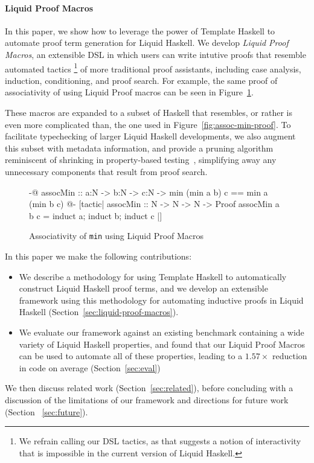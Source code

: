 \paragraph*{Liquid Proof Macros}

In this paper, we show how to leverage the power of Template Haskell
to automate proof term generation for Liquid Haskell.  We develop {\em
  Liquid Proof Macros}, an extensible DSL in which users can write
intutive proofs that resemble automated tactics%
\footnote{We refrain calling our DSL tactics, as that suggests a
  notion of interactivity that is impossible in the current version
  of Liquid Haskell.}%
%
 of more traditional proof assistants, including case analysis,
 induction, conditioning, and proof search. For example, the same
 proof of associativity of  using Liquid Proof macros can be
 seen in Figure~\ref{fig:assoc-min-macro}.

These macros are expanded to a subset of Haskell that resembles, or
rather is even more complicated than, the one used in
Figure~\ref{fig:assoc-min-proof}. To facilitate typechecking of larger
Liquid Haskell developments, we also augment this subset with metadata
information, and provide a pruning algorithm reminiscent of shrinking
in property-based testing~\cite{ClaessenH00}, simplifying away any
unnecessary components that result from proof search.


\begin{figure}[t]
\begin{code}
  {-@ assocMin :: a:N -> b:N -> c:N ->
        {min (min a b) c == min a (min b c)} @-}
  [tactic|
    assocMin :: N -> N -> N -> Proof
    assocMin a b c = induct a; induct b; induct c
  |]
\end{code}
\caption{Associativity of \texttt{min} using Liquid Proof Macros}
\label{fig:assoc-min-macro}
\end{figure}

\pagebreak
In this paper we make the following contributions:
\begin{itemize}
\item We describe a methodology for using Template Haskell to
  automatically construct Liquid Haskell proof terms, and we develop
  an extensible framework using this methodology for automating
  inductive proofs in Liquid Haskell
  (Section~\ref{sec:liquid-proof-macros}).
\item We evaluate our framework against an existing benchmark
  containing a wide variety of Liquid Haskell properties, and found
  that our Liquid Proof Macros can be used to automate all of these
  properties, leading to a $1.57\times$ reduction in code on average
  (Section~\ref{sec:eval})
\end{itemize}
We then discuss related work (Section~\ref{sec:related}), before
concluding with a discussion of the limitations of our framework and
directions for future work (Section ~\ref{sec:future}).
